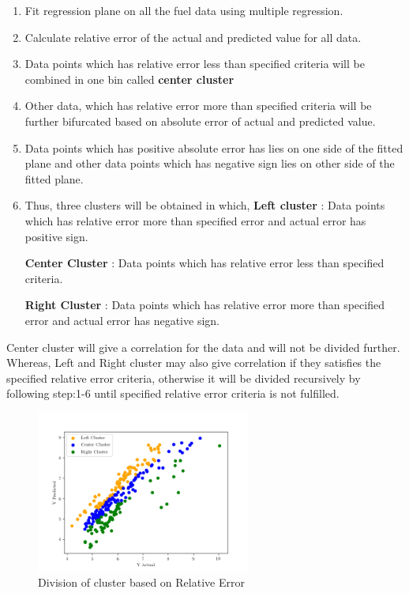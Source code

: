 \documentclass[12pt]{article}
\begin{document}
 \begin{enumerate}
	\item Fit regression plane on all the fuel data using multiple regression.
	\item Calculate relative error of the actual and predicted value for all data.
	\item Data points which has relative error less than specified criteria will be combined in one bin called \textbf{center cluster}
	
	\item Other data, which has relative error more than  specified criteria will be further bifurcated based on absolute error of actual and predicted value.
	
	\item Data points which has positive absolute error has lies on one side of the fitted plane and other data points which has negative sign lies on other side of the fitted plane.
	
	\item Thus, three clusters will be obtained in which,
	\subitem \textbf{Left cluster} : Data points which has relative error more than specified error and actual error has positive sign.
	
	\subitem \textbf{Center Cluster} : Data points which has relative error less than specified criteria.
	
	\subitem \textbf{Right Cluster} : Data points which has relative error more than specified error and actual error has negative sign. 
 \end{enumerate} 
 	Center cluster will give a correlation for the data and will not be divided further. Whereas, Left and Right cluster may also give correlation if they satisfies the specified relative error criteria, otherwise it will be divided recursively by following step:1-6 until specified relative error criteria is not fulfilled. 
 	
 \begin{figure}[H]
     \centering
     \includegraphics[width=0.63\textwidth]{images/cluster_visulization_0.png}
     \caption{Division of cluster based on Relative Error}
     \label{fig:cluster0}
 \end{figure}
\end{document}
